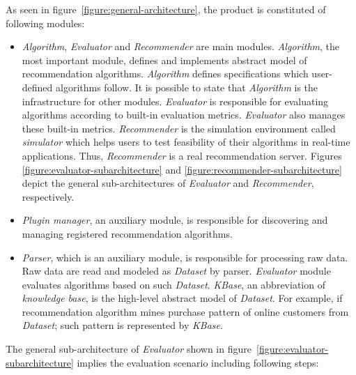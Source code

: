 \documentclass[a4paper,twoside]{article}
\begin{document}
As seen in figure~\ref{figure:general-architecture}, the product is constituted of following modules:
\begin{itemize}
\item \textit{Algorithm}, \textit{Evaluator} and \textit{Recommender} are main modules. \textit{Algorithm}, the most important module, defines and implements abstract model of recommendation algorithms. \textit{Algorithm} defines specifications which user-defined algorithms follow. It is possible to state that \textit{Algorithm} is the infrastructure for other modules. \textit{Evaluator} is responsible for evaluating algorithms according to built-in evaluation metrics. \textit{Evaluator} also manages these built-in metrics. \textit{Recommender} is the simulation environment called \textit{simulator} which helps users to test feasibility of their algorithms in real-time applications. Thus, \textit{Recommender} is a real recommendation server. Figures \ref{figure:evaluator-subarchitecture} and \ref{figure:recommender-subarchitecture} depict the general sub-architectures of \textit{Evaluator} and \textit{Recommender}, respectively.
\item \textit{Plugin manager}, an auxiliary module, is responsible for discovering and managing registered recommendation algorithms.
\item \textit{Parser}, which is an auxiliary module, is responsible for processing raw data. Raw data are read and modeled as \textit{Dataset} by parser. \textit{Evaluator} module evaluates algorithms based on such \textit{Dataset}. \textit{KBase}, an abbreviation of \textit{knowledge base}, is the high-level abstract model of \textit{Dataset}. For example, if recommendation algorithm mines purchase pattern of online customers from \textit{Dataset}; such pattern is represented by \textit{KBase}.
\end{itemize}
The general sub-architecture of \textit{Evaluator} shown in figure~\ref{figure:evaluator-subarchitecture} implies the evaluation scenario including following steps:
\end{document}
